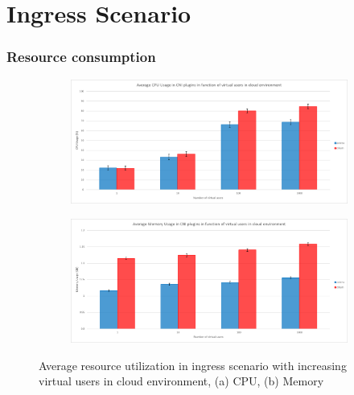 \section{Ingress Scenario}
\label{sec:ingressComparison}

\subsubsection{Resource consumption}
\label{sec:ingressResoureComsumption}


\begin{figure}[H]
    \centering
    \begin{subfigure}[b]{0.8\textwidth}
        \includegraphics[width=\textwidth]{plots/traffic-splitting/cpu_cloud.png}
        \caption{}
        \label{fig:cpu_cloud_avg}
    \end{subfigure}
    \begin{subfigure}[b]{0.8\textwidth}
        \includegraphics[width=\textwidth]{plots/traffic-splitting/memory_cloud.png}
        \caption{}
        \label{fig:memory_cloud_avg}
    \end{subfigure}
    
    \caption{Average resource utilization in ingress scenario with increasing virtual users in cloud environment, (a) CPU, (b) Memory}
    \label{fig:resource_cloud_avg}
\end{figure}

